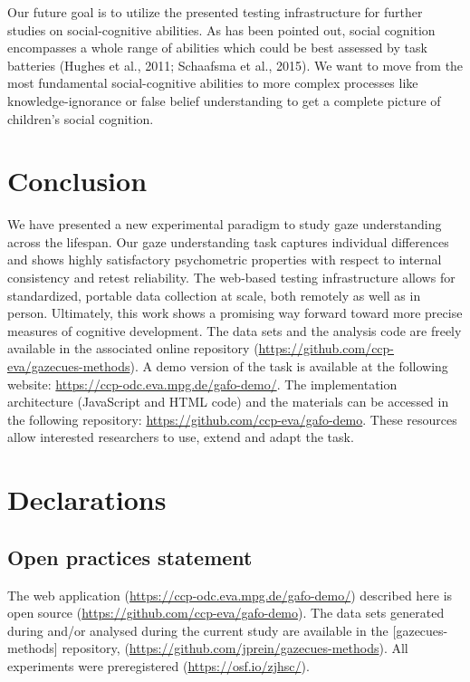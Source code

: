 \documentclass[
  man,floatsintext]{apa6}
\begin{document}
Our future goal is to utilize the presented testing infrastructure for further studies on social-cognitive abilities.
As has been pointed out, social cognition encompasses a whole range of abilities which could be best assessed by task batteries (Hughes et al., 2011; Schaafsma et al., 2015).
We want to move from the most fundamental social-cognitive abilities to more complex processes like knowledge-ignorance or false belief understanding to get a complete picture of children's social cognition.

\hypertarget{conclusion}{%
\section{Conclusion}\label{conclusion}}

We have presented a new experimental paradigm to study gaze understanding across the lifespan.
Our gaze understanding task captures individual differences and shows highly satisfactory psychometric properties with respect to internal consistency and retest reliability.
The web-based testing infrastructure allows for standardized, portable data collection at scale, both remotely as well as in person.
Ultimately, this work shows a promising way forward toward more precise measures of cognitive development.
The data sets and the analysis code are freely available in the associated online repository (\url{https://github.com/ccp-eva/gazecues-methods}).
A demo version of the task is available at the following website: \url{https://ccp-odc.eva.mpg.de/gafo-demo/}.
The implementation architecture (JavaScript and HTML code) and the materials can be accessed in the following repository: \url{https://github.com/ccp-eva/gafo-demo}.
These resources allow interested researchers to use, extend and adapt the task.

\newpage

\hypertarget{declarations}{%
\section{Declarations}\label{declarations}}

\hypertarget{open-practices-statement}{%
\subsection{Open practices statement}\label{open-practices-statement}}

The web application (\url{https://ccp-odc.eva.mpg.de/gafo-demo/}) described here is open source (\url{https://github.com/ccp-eva/gafo-demo}).
The data sets generated during and/or analysed during the current study are available in the {[}gazecues-methods{]} repository, (\url{https://github.com/jprein/gazecues-methods}).
All experiments were preregistered (\url{https://osf.io/zjhsc/}).
\end{document}
